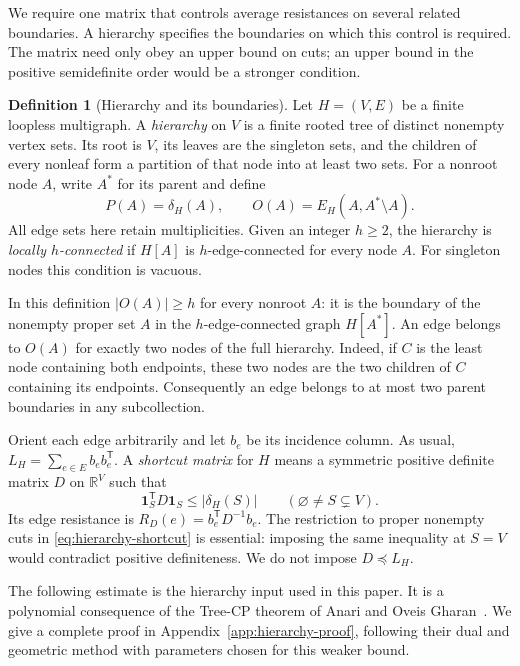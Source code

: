 \documentclass[11pt]{amsart}
\theoremstyle{definition}
\newtheorem{definition}[theorem]{Definition}
\theoremstyle{remark}
\numberwithin{equation}{section}
\begin{document}
We require one matrix that controls average resistances on several related
boundaries.  A hierarchy specifies the boundaries on which this control is
required.  The matrix need only obey an upper bound on cuts; an upper bound
in the positive semidefinite order would be a stronger condition.

\begin{definition}[Hierarchy and its boundaries]\label{def:hierarchy}
Let $H=(V,E)$ be a finite loopless multigraph.  A \emph{hierarchy} on $V$
is a finite rooted tree of distinct nonempty vertex sets.  Its root is $V$,
its leaves are the singleton sets, and the children of every nonleaf form
a partition of that node into at least two sets.  For a nonroot node $A$,
write $A^*$ for its parent and define
\[
 P(A)=\delta_H(A),\qquad
 O(A)=E_H(A,A^*\setminus A).
\]
All edge sets here retain multiplicities.  Given an integer $h\ge2$, the
hierarchy is \emph{locally $h$-connected} if $H[A]$ is $h$-edge-connected
for every node $A$.  For singleton nodes this condition is vacuous.
\end{definition}

In this definition $|O(A)|\ge h$ for every nonroot $A$: it is the boundary
of the nonempty proper set $A$ in the $h$-edge-connected graph $H[A^*]$.
An edge belongs to $O(A)$ for exactly two nodes of the full hierarchy.
Indeed, if $C$ is the least node containing both endpoints, these two
nodes are the two children of $C$ containing its endpoints.  Consequently
an edge belongs to at most two parent boundaries in any subcollection.

Orient each edge arbitrarily and let $b_e$ be its incidence column.  As
usual, $L_H=\sum_{e\in E}b_eb_e^{\mathsf T}$.  A \emph{shortcut matrix}
for $H$ means a symmetric positive definite matrix $D$ on $\mathbb R^V$
such that
\begin{equation}\label{eq:hierarchy-shortcut}
 \mathbf 1_S^{\mathsf T}D\mathbf 1_S\le |\delta_H(S)|
 \qquad(\varnothing\ne S\subsetneq V).
\end{equation}
Its edge resistance is $R_D(e)=b_e^{\mathsf T}D^{-1}b_e$.
The restriction to proper nonempty cuts in
\eqref{eq:hierarchy-shortcut} is essential: imposing the same inequality
at $S=V$ would contradict positive definiteness.  We do not impose
$D\preceq L_H$.

The following estimate is the hierarchy input used in this paper.
It is a polynomial consequence of the Tree-CP theorem of Anari and
Oveis Gharan~\cite[Theorem~3.5, printed p.~22]{AOG}.  We give a complete
proof in Appendix~\ref{app:hierarchy-proof}, following their dual and
geometric method with parameters chosen for this weaker bound.
\end{document}
